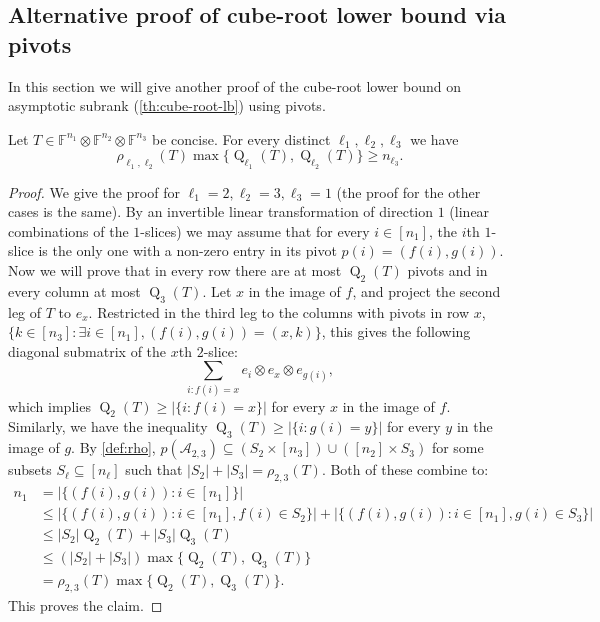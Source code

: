 \documentclass{daj}
\DeclareMathOperator{\subrank}{Q}
\newcommand{\FF}{\mathbb{F}}
\begin{document}
%

%

\subsection{Alternative proof of cube-root lower bound via pivots} \label{subsec:cube-root-via-pivots}

In this section we will give another proof of the cube-root lower bound on asymptotic subrank (\autoref{th:cube-root-lb}) using pivots. %

\begin{theorem}\label{th:pivot-uncertainty}
    Let $T \in \FF^{n_1} \otimes \FF^{n_2} \otimes \FF^{n_3}$ be concise.
    For every distinct ${\ell_1},{\ell_2},{\ell_3}$ we have 
    \[
    \rho_{{\ell_1},{\ell_2}}(T) \max \{\subrank_{\ell_1}(T), \subrank_{\ell_2}(T)\} \geq n_{\ell_3}.
    \]
\end{theorem}
\begin{proof}
%
%
%
%
%
We give the proof for ${\ell_1}=2, {\ell_2}=3, {\ell_3}=1$ (the proof for the other cases is the same).
%
By an invertible linear transformation of direction $1$ (linear combinations of the $1$-slices) we may assume that for every $i\in[n_1]$, the $i$th $1$-slice is the only one with a non-zero entry in its pivot $p(i)=(f(i),g(i))$. Now we will prove that in every row there are at most $\subrank_2(T)$ pivots and in every column at most $\subrank_3(T)$. %
Let $x$ in the image of $f$, and project the second leg of $T$ to $e_x$. Restricted in the third leg to the columns with pivots in row $x$, $\{k\in[n_3]:\exists i\in[n_1], (f(i),g(i))=(x,k)\}$, this gives the following diagonal submatrix of the $x$th $2$-slice:
\[
\sum_{i: f(i) = x} e_i \otimes e_x \otimes e_{g(i)},
\]
which implies $\subrank_2(T) \geq | \{i : f(i) = x\}|$ for every $x$ in the image of $f$. Similarly, we have the inequality $\subrank_3(T) \geq | \{i : g(i) = y\}|$ for every $y$ in the image of $g$.
%
By \autoref{def:rho}, $p(\mathcal{A}_{2,3}) \subseteq (S_2 \times [n_3]) \cup ([n_2] \times S_3)$ for some subsets $S_\ell \subseteq [n_\ell]$ such that $|S_2| + |S_3| = \rho_{2,3}(T)$.
%
%
%
%
%
%
%
%
%
%
%
%
Both of these combine to:
\begin{align*}
n_1 &= |\{(f(i), g(i)) : i\in [n_1]\}|\\ &\leq |\{(f(i),g(i)): i \in [n_1], f(i) \in S_2\}| + |\{(f(i),g(i)) : i \in [n_1], g(i) \in S_3\}|\\
&\leq |S_2| \subrank_2(T) + |S_3| \subrank_3(T)\\
&\leq (|S_2| + |S_3|) \max \{\subrank_2(T), \subrank_3(T)\}\\
&= \rho_{2,3}(T) \max \{\subrank_2(T), \subrank_3(T)\}.
\end{align*}
This proves the claim.
\end{proof}
\end{document}
